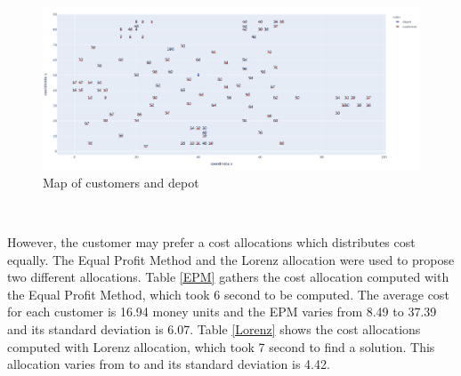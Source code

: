 \begin{figure}[H]
	\centering
		\includegraphics[width=\linewidth]{./img/aumman.png}
	\caption{Map of customers and depot}
	\label{map}
\end{figure}\

However, the customer may prefer a cost allocations which distributes cost equally. The Equal Profit Method and the Lorenz allocation were used to propose two different allocations. Table \ref{EPM} gathers the cost allocation computed with the Equal Profit Method, which took 6 second to be computed. The average cost for each customer is 16.94 money units and the EPM varies from 8.49 to 37.39 and its standard deviation is 6.07. Table \ref{Lorenz} shows the cost allocations computed with Lorenz allocation, which took 7 second to find a solution. This allocation varies from to and its standard deviation is 4.42.


